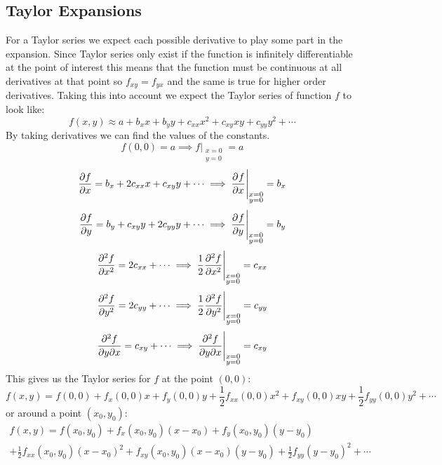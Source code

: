 \documentclass{article}
\begin{document}
    \subsection{Taylor Expansions}
    For a Taylor series we expect each possible derivative to play some part in the expansion.
    Since Taylor series only exist if the function is infinitely differentiable at the point of interest this means that the function must be continuous at all derivatives at that point so \(f_{xy} = f_{yx}\) and the same is true for higher order derivatives.
    Taking this into account we expect the Taylor series of function \(f\) to look like:
    \[f(x, y)\approx a + b_x x + b_y y + c_{xx}x^2 + c_{xy}xy + c_{yy}y^2 + \dotsb\]
    By taking derivatives we can find the values of the constants.
    \[f(0, 0) = a \implies f\bigr|_{\substack{x=0\\y=0}} = a\]
    \[\pdv{f}{x} = b_x + 2c_{xx}x + c_{xy}y + \dotsb \implies \pdv[]{f}{x}\Biggr|_{\substack{x=0\\y=0}} = b_x\]
    \[\pdv{f}{y} = b_y + c_{xy}y + 2c_{yy}y + \dotsb \implies \pdv[]{f}{y}\Biggr|_{\substack{x=0\\y=0}} = b_y\]
    \[\pdv[2]{f}{x} = 2c_{xx} + \dotsb \implies \frac{1}{2}\pdv[2]{f}{x}\Biggr|_{\substack{x=0\\y=0}} = c_{xx}\]
    \[\pdv[2]{f}{y} = 2c_{yy} + \dotsb \implies \frac{1}{2}\pdv[2]{f}{y}\Biggr|_{\substack{x=0\\y=0}} = c_{yy}\]
    \[\frac{\partial^2{f}}{\partial{y}\partial{x}} = c_{xy} + \dotsb \implies \frac{\partial^2{f}}{\partial{y}\partial{x}}\Biggr|_{\substack{x=0\\y=0}} = c_{xy}\]
    This gives us the Taylor series for \(f\) at the point \((0, 0)\):
    \[f(x, y) = f(0, 0) + f_x(0, 0)x + f_y(0, 0)y + \frac{1}{2}f_{xx}(0, 0)x^2 + f_{xy}(0, 0)xy + \frac{1}{2}f_{yy}(0, 0)y^2 + \dotsb\]
    or around a point \((x_0, y_0)\):
    \begin{multline*}
        f(x, y) = f(x_0, y_0) + f_x(x_0, y_0)(x - x_0) + f_y(x_0, y_0)(y - y_0) \\+ \frac{1}{2}f_{xx}(x_0, y_0)(x - x_0)^2 + f_{xy}(x_0, y_0)(x - x_0)(y - y_0) + \frac{1}{2}f_{yy}(y - y_0)^2 + \dotsb
    \end{multline*}
    
\end{document}
